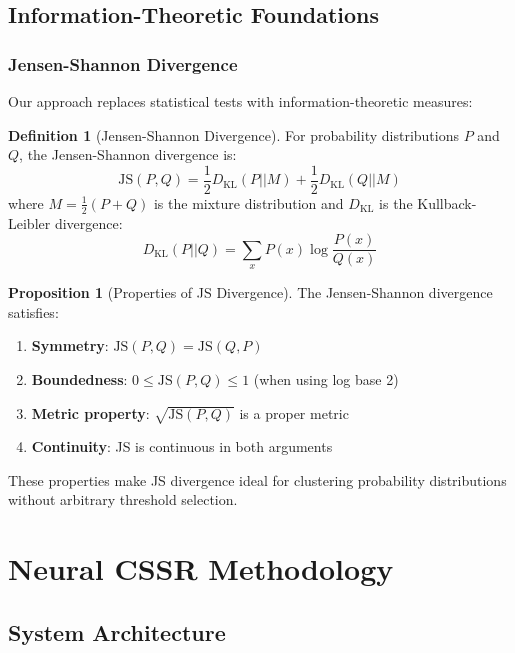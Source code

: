 \documentclass[11pt,a4paper]{report}
\newcommand{\JS}{\text{JS}}
\newcommand{\KL}{D_{\text{KL}}}
\theoremstyle{definition}
\newtheorem{definition}{Definition}[chapter]
\newtheorem{proposition}[theorem]{Proposition}
\begin{document}
\section{Information-Theoretic Foundations}
\label{sec:info-theory}

\subsection{Jensen-Shannon Divergence}

Our approach replaces statistical tests with information-theoretic measures:

\begin{definition}[Jensen-Shannon Divergence]
\label{def:js-divergence}
For probability distributions $P$ and $Q$, the Jensen-Shannon divergence is:
$$\JS(P, Q) = \frac{1}{2}\KL(P||M) + \frac{1}{2}\KL(Q||M)$$
where $M = \frac{1}{2}(P + Q)$ is the mixture distribution and $\KL$ is the Kullback-Leibler divergence:
$$\KL(P||Q) = \sum_{x} P(x) \log \frac{P(x)}{Q(x)}$$
\end{definition}

\begin{proposition}[Properties of JS Divergence]
\label{prop:js-properties}
The Jensen-Shannon divergence satisfies:
\begin{enumerate}
    \item \textbf{Symmetry}: $\JS(P,Q) = \JS(Q,P)$
    \item \textbf{Boundedness}: $0 \leq \JS(P,Q) \leq 1$ (when using log base 2)
    \item \textbf{Metric property}: $\sqrt{\JS(P,Q)}$ is a proper metric
    \item \textbf{Continuity}: JS is continuous in both arguments
\end{enumerate}
\end{proposition}

These properties make JS divergence ideal for clustering probability distributions without arbitrary threshold selection.

\chapter{Neural CSSR Methodology}
\label{ch:methodology}

\section{System Architecture}
\label{sec:architecture}
\end{document}

